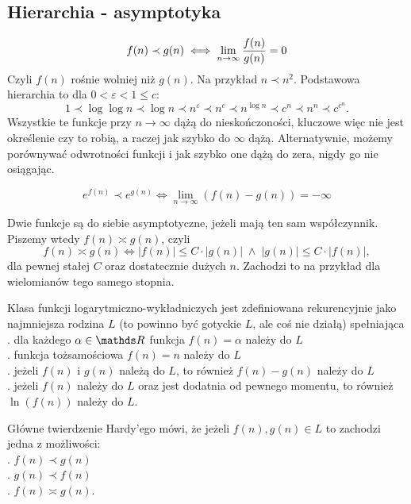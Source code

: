\subsection{Hierarchia - asymptotyka}
$$f(n)\prec g(n)\iff\lim\limits_{n\to\infty}{f(n)\over g(n)}=0$$
Czyli $f(n)$ rośnie wolniej niż $g(n)$. Na przykład $n\prec n^2$. Podstawowa hierarchia to dla $0<\varepsilon<1\leq c$:
$$1\prec \log\log n\prec\log n\prec n^\varepsilon\prec n^c\prec n^{\log n}\prec c^n\prec n^n\prec c^{c^n}.$$
Wszystkie te funkcje przy $n\to\infty$ dążą do nieskończoności, kluczowe więc nie jest określenie czy to robią, a raczej {\color{acc}jak szybko do $\infty$ dążą}. Alternatywnie, możemy porównywać odwrotności funkcji i jak szybko one dążą do zera, nigdy go nie osiągając.\bigskip

$$e^{f(n)}\prec e^{g(n)}\iff \lim\limits_{n\to \infty}(f(n)-g(n))=-\infty$$

Dwie funkcje są do siebie {\color{def}asymptotyczne}, jeżeli mają {\color{acc}ten sam współczynnik}. Piszemy wtedy $f(n)\asymp g(n)$, czyli
$$f(n)\asymp g(n)\iff |f(n)|\leq C\cdot |g(n)|\;\land\;|g(n)|\leq C\cdot|f(n)|,$$
dla pewnej stałej $C$ oraz dostatecznie dużych $n$. Zachodzi to na przykład dla wielomianów tego samego stopnia.\bigskip

{\color{def}Klasa funkcji logarytmiczno-wykładniczych} jest zdefiniowana rekurencyjnie jako najmniejsza rodzina $L$ (to powinno być gotyckie $L$, ale coś nie działą) spełniająca\smallskip\\
. dla każdego $\alpha\in \R$ funkcja $f(n)=\alpha$ należy do $L$\\
. funkcja tożsamościowa $f(n)=n$ należy do $L$\\
. jeżeli $f(n)$ i $g(n)$ należą do $L$, to również $f(n)-g(n)$ należy do $L$\\
. jeżeli $f(n)$ należy do $L$ oraz jest dodatnia od pewnego momentu, to również $\ln(f(n))$ należy do $L$.\medskip

{\color{def}Główne twierdzenie Hardy'ego} mówi, że jeżeli $f(n), g(n)\in L$ to zachodzi jedna z możliwości:\smallskip\\
. $f(n)\prec g(n)$\\
. $g(n)\prec f(n)$\\
. $f(n)\asymp g(n)$.